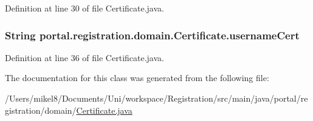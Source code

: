 Definition at line 30 of file Certificate.java.

\hypertarget{classportal_1_1registration_1_1domain_1_1Certificate_a27dd5145ea35c206c000e87485841d50}{
\subsubsection[{usernameCert}]{\setlength{\rightskip}{0pt plus 5cm}String {\bf portal.registration.domain.Certificate.usernameCert}}}
\label{classportal_1_1registration_1_1domain_1_1Certificate_a27dd5145ea35c206c000e87485841d50}


Definition at line 36 of file Certificate.java.



The documentation for this class was generated from the following file:\begin{DoxyCompactItemize}
\item 
/Users/mikel8/Documents/Uni/workspace/Registration/src/main/java/portal/registration/domain/\hyperlink{Certificate_8java}{Certificate.java}\end{DoxyCompactItemize}
